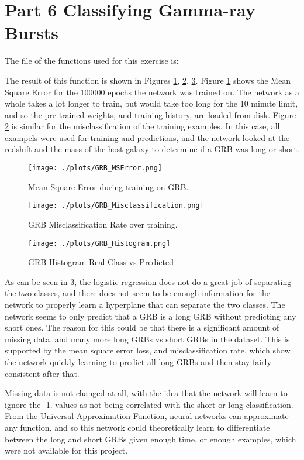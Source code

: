 \section{Part 6 Classifying Gamma-ray Bursts}

The file of the functions used for this exercise is:



The result of this function is shown in Figures \ref{fig:mse}, \ref{fig:misclassify}, \ref{fig:predction}.
Figure \ref{fig:mse} shows the Mean Square Error for the 100000 epochs the network was trained on. The network as a whole
takes a lot longer to train, but would take too long for the 10 minute limit, and so the pre-trained weights, and training history, are loaded from disk.
Figure \ref{fig:misclassify} is similar for the misclassification of the training examples. In this case,
all exampels were used for training and predictions, and the network looked at the redshift and the mass of the host galaxy to determine if
a GRB was long or short.

\begin{figure}[h!]
  \centering
  \texttt{[image: ./plots/GRB\_MSError.png]}
  \caption{Mean Square Error during training on GRB.}
  \label{fig:mse}
\end{figure}

\begin{figure}[h!]
  \centering
  \texttt{[image: ./plots/GRB\_Misclassification.png]}
  \caption{GRB Misclassification Rate over training.}
  \label{fig:misclassify}
\end{figure}

\begin{figure}[h!]
  \centering
  \texttt{[image: ./plots/GRB\_Histogram.png]}
  \caption{GRB Histogram Real Class vs Predicted}
  \label{fig:predction}
\end{figure}

As can be seen in \ref{fig:predction}, the logistic regression does not do a great
job of separating the two classes, and there does not seem to be enough
information for the network to properly learn a hyperplane that can
separate the two classes. The network seems to only predict that a GRB is a long GRB without predicting any short ones.
The reason for this could be that there is a significant amount of missing data, and many more long GRBs vs short GRBs in
the dataset. This is supported by the mean square error loss, and misclassification rate, which show the network quickly learning
to predict all long GRBs and then stay fairly consistent after that.

Missing data is not
changed at all, with the idea that the network will learn to ignore the -1. values as not
being correlated with the short or long classification. From the Universal Approximation Function,
neural networks can approximate any function, and so this network could theoretically learn to differentiate between
the long and short GRBs given enough time, or enough examples, which were not available for this project.

